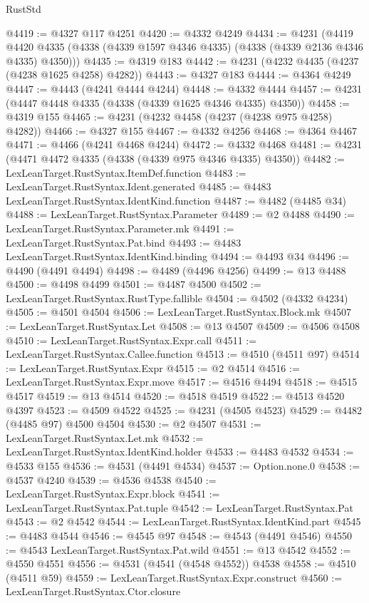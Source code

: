 \begin{lexlean}{RustStd}
\begin{coremodule}
{\begin{coremodule}
{{{{{{{{{{{{{{{{{{{{{{{{{{{{{{{{{{{{{{{{{{{{{{{{{{{{{{{@4419 := @4327 @117 @4251
@4420 := @4332 @4249
@4434 := @4231
    (@4419 @4420 @4335 (@4338 (@4339 @1597 @4346 @4335) (@4338 (@4339 @2136 @4346 @4335) @4350)))
@4435 := @4319 @183
@4442 := @4231 (@4232 @4435 (@4237 (@4238 @1625 @4258) @4282))
@4443 := @4327 @183
@4444 := @4364 @4249
@4447 := @4443 (@4241 @4444 @4244)
@4448 := @4332 @4444
@4457 := @4231 (@4447 @4448 @4335 (@4338 (@4339 @1625 @4346 @4335) @4350))
@4458 := @4319 @155
@4465 := @4231 (@4232 @4458 (@4237 (@4238 @975 @4258) @4282))
@4466 := @4327 @155
@4467 := @4332 @4256
@4468 := @4364 @4467
@4471 := @4466 (@4241 @4468 @4244)
@4472 := @4332 @4468
@4481 := @4231 (@4471 @4472 @4335 (@4338 (@4339 @975 @4346 @4335) @4350))
@4482 := LexLeanTarget.RustSyntax.ItemDef.function
@4483 := LexLeanTarget.RustSyntax.Ident.generated
@4485 := @4483 LexLeanTarget.RustSyntax.IdentKind.function
@4487 := @4482 (@4485 @34)
@4488 := LexLeanTarget.RustSyntax.Parameter
@4489 := @2 @4488
@4490 := LexLeanTarget.RustSyntax.Parameter.mk
@4491 := LexLeanTarget.RustSyntax.Pat.bind
@4493 := @4483 LexLeanTarget.RustSyntax.IdentKind.binding
@4494 := @4493 @34
@4496 := @4490 (@4491 @4494)
@4498 := @4489 (@4496 @4256)
@4499 := @13 @4488
@4500 := @4498 @4499
@4501 := @4487 @4500
@4502 := LexLeanTarget.RustSyntax.RustType.fallible
@4504 := @4502 (@4332 @4234)
@4505 := @4501 @4504
@4506 := LexLeanTarget.RustSyntax.Block.mk
@4507 := LexLeanTarget.RustSyntax.Let
@4508 := @13 @4507
@4509 := @4506 @4508
@4510 := LexLeanTarget.RustSyntax.Expr.call
@4511 := LexLeanTarget.RustSyntax.Callee.function
@4513 := @4510 (@4511 @97)
@4514 := LexLeanTarget.RustSyntax.Expr
@4515 := @2 @4514
@4516 := LexLeanTarget.RustSyntax.Expr.move
@4517 := @4516 @4494
@4518 := @4515 @4517
@4519 := @13 @4514
@4520 := @4518 @4519
@4522 := @4513 @4520 @4397
@4523 := @4509 @4522
@4525 := @4231 (@4505 @4523)
@4529 := @4482 (@4485 @97) @4500 @4504
@4530 := @2 @4507
@4531 := LexLeanTarget.RustSyntax.Let.mk
@4532 := LexLeanTarget.RustSyntax.IdentKind.holder
@4533 := @4483 @4532
@4534 := @4533 @155
@4536 := @4531 (@4491 @4534)
@4537 := Option.none.{0}
@4538 := @4537 @4240
@4539 := @4536 @4538
@4540 := LexLeanTarget.RustSyntax.Expr.block
@4541 := LexLeanTarget.RustSyntax.Pat.tuple
@4542 := LexLeanTarget.RustSyntax.Pat
@4543 := @2 @4542
@4544 := LexLeanTarget.RustSyntax.IdentKind.part
@4545 := @4483 @4544
@4546 := @4545 @97
@4548 := @4543 (@4491 @4546)
@4550 := @4543 LexLeanTarget.RustSyntax.Pat.wild
@4551 := @13 @4542
@4552 := @4550 @4551
@4556 := @4531 (@4541 (@4548 @4552)) @4538
@4558 := @4510 (@4511 @59)
@4559 := LexLeanTarget.RustSyntax.Expr.construct
@4560 := LexLeanTarget.RustSyntax.Ctor.closure
}}}}}}}}}}}}}}}}}}}}}}}}}}}}}}}}}}}}}}}}}}}}}}}}}}}}}}}
\end{coremodule}}
\end{coremodule}
\end{lexlean}
